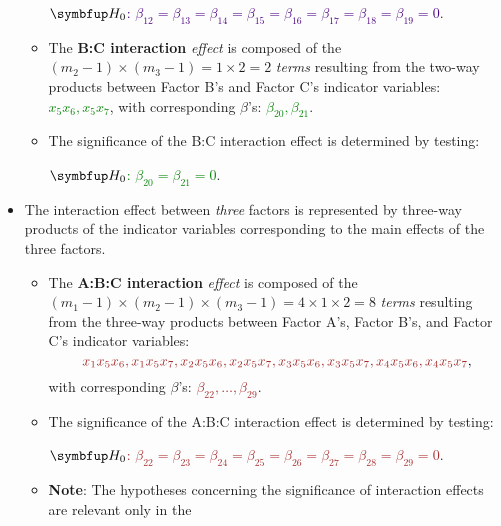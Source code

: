 \begin{itemize}
\begin{itemize}
                        \begin{tightcenter}
                              \textcolor{Indigo}{$ \HN $: $\beta_{12}=\beta_{13}=\beta_{14}=\beta_{15}=\beta_{16}=\beta_{17}=\beta_{18}=\beta_{19}=0$}.
                        \end{tightcenter}
                  \item The \textbf{B:C interaction} \emph{effect} is composed of the $ (m_2-1)\times (m_3-1)=1\times 2=2 $ \emph{terms}
                        resulting from the two-way products between Factor B's and Factor C's indicator variables: \textcolor{Green}{$ x_5x_6,x_5x_7 $},
                        with corresponding $ \beta $'s: \textcolor{Green}{$ \beta_{20},\beta_{21} $}.
                  \item The significance of the B:C interaction effect is determined by testing:
                        \begin{tightcenter}
                              \textcolor{Green}{$ \HN $: $\beta_{20}=\beta_{21}=0$}.
                        \end{tightcenter}
            \end{itemize}
      \item The interaction effect between \emph{three} factors is represented by three-way products of the indicator variables
            corresponding to the main effects of the three factors.
            \begin{itemize}
                  \item The \textbf{A:B:C interaction} \emph{effect} is composed of the $ (m_1-1)\times (m_2-1)\times (m_3-1)=4\times 1\times 2=8 $ \emph{terms}
                        resulting from the three-way products between Factor A's, Factor B's, and Factor C's indicator variables:
                        \[ \textcolor{Brown}{x_1x_5x_6,x_1x_5x_7,x_2x_5x_6,x_2x_5x_7,x_3x_5x_6,x_3x_5x_7,x_4x_5x_6,x_4x_5x_7}, \]
                        with corresponding $ \beta $'s: \textcolor{Brown}{$ \beta_{22},\ldots,\beta_{29} $}.
                  \item The significance of the A:B:C interaction effect is determined by testing:
                        \begin{tightcenter}
                              \textcolor{Brown}{$ \HN $: $ \beta_{22}=\beta_{23}=\beta_{24}=\beta_{25}=\beta_{26}=\beta_{27}=\beta_{28}=\beta_{29}=0 $}.
                        \end{tightcenter}
                  \item \textbf{Note}: The hypotheses concerning the significance of interaction effects are relevant only in the

\end{itemize}
\end{itemize}
